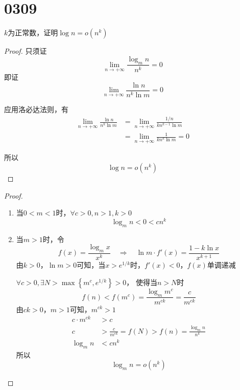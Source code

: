 \section{0309}

\begin{questions}

    \question $k$为正常数，证明$\log{n} = o(n^k)$
    \begin{solution}
        \begin{proof}
            只须证\[
                \lim_{n \rightarrow + \infty} \frac{ \log_m n }{ n^k } = 0
            \]
            即证\[
                \lim_{n \rightarrow + \infty} \frac{ \ln n }{ n^k \ln m } = 0
            \]

            应用洛必达法则，有\begin{align*}
                \lim_{n \rightarrow + \infty} \frac{ \ln n }{ n^k \ln m }
                 & = \lim_{n \rightarrow + \infty} \frac{ 1/ n }{ k n^{k-1} \ln m } \\
                 & = \lim_{n \rightarrow + \infty} \frac{ 1 }{ k n^{k} \ln m } = 0
            \end{align*}

            所以\[
                \log{n} = o(n^k)
            \]
        \end{proof}
    \end{solution}

    \begin{solution}
        \begin{proof}
            \begin{enumerate}
                \item 当$0 < m < 1$时，$\forall c > 0, n > 1, k > 0$ $$
                          \log_m{n} < 0 < c n^k
                      $$
                \item 当$m > 1$时，令\[
                          f(x) = \frac{\log_m{x}}{ x^k }
                          \quad \Longrightarrow \quad
                          \ln{m} \cdot f'(x) = \frac{1 - k \ln{x}}{ x^{k+1}  }
                      \]
                      由$k > 0$，$\ln m > 0$可知，当$x > e^{1/k}$时，$f'(x) < 0$，$f(x)$单调递减

                      $\forall c > 0, \exists N > \max\left\{ m^c, e^{1/k} \right\}  > 0$，
                      使得当$n > N$时 $$
                          f(n) < f(m^c) =\frac{\log_m{m^c}}{m^{ck}} = \frac{c}{m^{ck}}
                      $$
                      由$ck>0$，$m>1$可知，$m^{ck} > 1$
                      \begin{align*}
                          c \cdot m^{ck} & > c                                                      \\
                          c              & > \frac{c}{m^{ck}} = f(N) > f(n) = \frac{\log_m{n}}{n^k} \\
                          \log_m{n}      & < c n^k
                      \end{align*}
                      所以$$\log_m{n} = o(n^k)$$
            \end{enumerate}
        \end{proof}
    \end{solution}


\end{questions}
